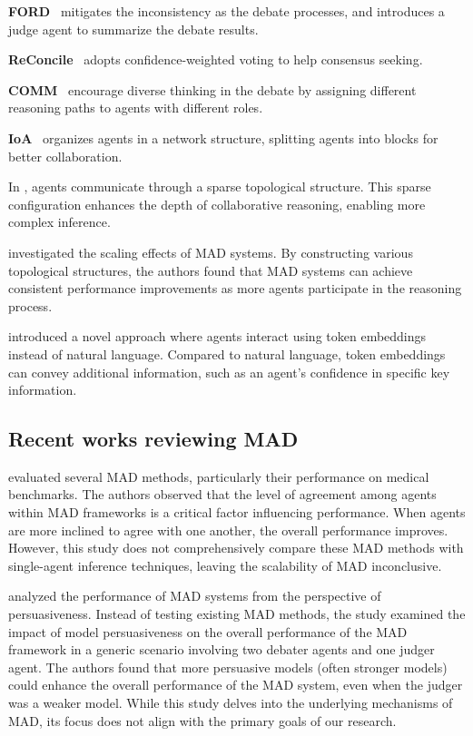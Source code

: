 \textbf{FORD}~\cite{xiong-FORD} mitigates the inconsistency as the debate processes, and introduces a judge agent to summarize the debate results.

\textbf{ReConcile}~\cite{chen2024reconcile} adopts confidence-weighted voting to help consensus seeking. 

\textbf{COMM}~\cite{chen2024comm} encourage diverse thinking in the debate by assigning different reasoning paths to agents with different roles.

\textbf{IoA}~\cite{chen2024IoA} organizes agents in a network structure, splitting agents into blocks for better collaboration. 

In \cite{li2024Sparse}, agents communicate through a sparse topological structure. This sparse configuration enhances the depth of collaborative reasoning, enabling more complex inference.

\citet{qian2024scaling} investigated the scaling effects of MAD systems. By constructing various topological structures, the authors found that MAD systems can achieve consistent performance improvements as more agents participate in the reasoning process.

\citet{pham2023let} introduced a novel approach where agents interact using token embeddings instead of natural language. Compared to natural language, token embeddings can convey additional information, such as an agent’s confidence in specific key information.

\subsection{Recent works reviewing MAD}

\citet{smit2023we} evaluated several MAD methods, particularly their performance on medical benchmarks. The authors observed that the level of agreement among agents within MAD frameworks is a critical factor influencing performance. When agents are more inclined to agree with one another, the overall performance improves. However, this study does not comprehensively compare these MAD methods with single-agent inference techniques, leaving the scalability of MAD inconclusive. 

\citet{khan2024debating} analyzed the performance of MAD systems from the perspective of persuasiveness. Instead of testing existing MAD methods, the study examined the impact of model persuasiveness on the overall performance of the MAD framework in a generic scenario involving two debater agents and one judger agent. The authors found that more persuasive models (often stronger models) could enhance the overall performance of the MAD system, even when the judger was a weaker model. While this study delves into the underlying mechanisms of MAD, its focus does not align with the primary goals of our research.

